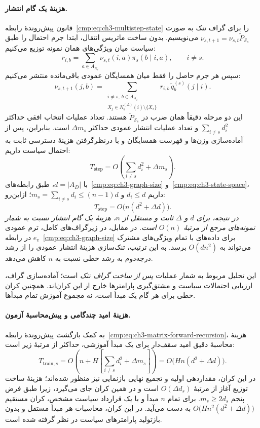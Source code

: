 \paragraph{هزینهٔ یک گام انتشار.}
قانون پیش‌روندهٔ
رابطه~\eqref{cmp:eq:ch3-multistep-state}
را برای گراف تنک به صورت
$\nu_{s,t+1}=\nu_{s,t}\widetilde P_{\mathcal S_s}$
می‌نویسیم. بدون ساخت ماتریس انتقال،
ابتدا جرم احتمال را طبق سیاست
میان ویژگی‌های همان نمونه توزیع
می‌کنیم:
\[
r_{i,b}=\sum_{a\in A_{X_i}}
\nu_{s,t}(i,a)\pi_s(b\mid i,a),
\qquad i\ne s.
\]
سپس هر جرم حاصل را فقط میان
همسایگان عمودی باقی‌مانده
منتشر می‌کنیم:
\[
\nu_{s,t+1}(j,b)
=\sum_{\substack{i\ne s,\ b\in A_{X_i}\\
X_j\in N_b^{(\Delta)}(i)\setminus\{X_s\}}}
r_{i,b}\,\widetilde q_b^{(s)}(j\mid i).
\]
این دو مرحله دقیقاً همان ضرب
در $\widetilde P_{\mathcal S_s}$
هستند. تعداد عملیات انتخاب افقی
حداکثر $\sum_{i\ne s}d_i^2$
و تعداد عملیات انتشار عمودی
حداکثر $\Delta m_s$ است. بنابراین،
پس از آماده‌سازی وزن‌ها و فهرست
همسایگان و با درنظرگرفتن هزینهٔ
دسترسی ثابت به احتمال سیاست داریم:
\begin{equation}\label{cmp:eq:ch3-sparse-step-cost}
\boxed{
T_{\mathrm{step}}
=O\left(\sum_{i\ne s}d_i^2+
\Delta m_s\right).
}
\end{equation}
با $d=|A_D|$، طبق
رابطه‌های~\eqref{cmp:eq:ch3-graph-size}
و~\eqref{cmp:eq:ch3-state-space}،
داریم $d_i\le d$ و
$m_s=\sum_{i\ne s}d_i\le(n-1)d$؛
ازاین‌رو:
\begin{equation}\label{cmp:eq:ch3-sparse-linear-bound}
\boxed{
T_{\mathrm{step}}
=O\bigl(n(d^2+\Delta d)\bigr).
}
\end{equation}
\emph{در نتیجه، برای $d$ و $\Delta$
ثابت و مستقل از $n$، هزینهٔ یک
گام انتشار نسبت به شمار نمونه‌های
مرجع از مرتبهٔ $O(n)$ است.}
در مقابل، در زیرگراف‌های کامل،
ترم عمودی $e_v$ در
رابطه~\eqref{cmp:eq:ch3-graph-size}
برای داده‌های با تمام ویژگی‌های
مشترک می‌تواند به $O(dn^2)$ برسد.
به این ترتیب، تنک‌سازی هزینهٔ
انتشار عمودی را از رشد درجه‌دوم
به رشد خطی نسبت به $n$ کاهش می‌دهد.

این تحلیل مربوط به شمار عملیات
\emph{پس از ساخت گراف تنک} است؛
آماده‌سازی گراف، ارزیابی احتمالات سیاست
و مشتق‌گیری پارامترها خارج از این کران‌اند. همچنین کران خطی
برای هر گام یک مبدأ است، نه
مجموع آموزش تمام مبدأها.

\paragraph{هزینهٔ امید چندگامی و پیش‌محاسبهٔ آزمون.}
به کمک بازگشت پیش‌روندهٔ
رابطه~\eqref{cmp:eq:ch3-matrix-forward-recursion}،
هزینهٔ محاسبهٔ دقیق امید سقف‌دار
برای یک مبدأ آموزشی، حداکثر از
مرتبهٔ زیر است:
\begin{equation}\label{cmp:eq:ch3-sparse-training-cost}
\boxed{
T_{\mathrm{train},s}
=O\left(n+H\left[
\sum_{i\ne s}d_i^2+\Delta m_s
\right]\right)
= O\bigl(Hn(d^2+\Delta d)\bigr).
}
\end{equation}
در این کران، مقداردهی اولیه و تجمیع نهایی
بازنمایی نیز منظور شده‌اند؛ هزینهٔ ساخت توزیع آغاز
از مرتبهٔ $O(\Delta d_s)$ است و در همین کران
جای می‌گیرد، زیرا طبق فرض پنجم $m_s\ge2d_s$.
برای تمام $n$ مبدأ و با یک
قرارداد سیاست مشخص، کران مستقیم
$O\bigl(Hn^2(d^2+\Delta d)\bigr)$
به دست می‌آید. در این کران،
محاسبات هر مبدأ مستقل و بدون
بازتولید پارامترهای سیاست
در نظر گرفته شده است.

